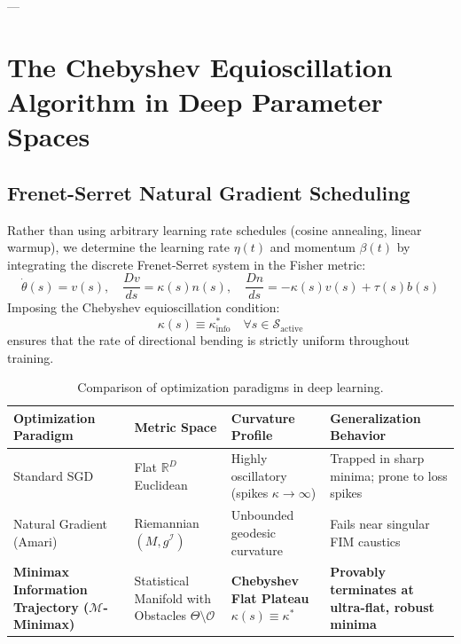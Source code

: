 \documentclass[11pt,reqno]{amsart}
\theoremstyle{definition}
\providecommand{\R}{\mathbb{R}}
\newcommand{\Fisher}{\mathcal{I}}
\numberwithin{equation}{section}
\providecommand{\R}{\mathbb{R}}
\begin{document}
---

\section{The Chebyshev Equioscillation Algorithm in Deep Parameter Spaces}

\subsection{Frenet-Serret Natural Gradient Scheduling}
Rather than using arbitrary learning rate schedules (cosine annealing, linear warmup), we determine the learning rate $\eta(t)$ and momentum $\beta(t)$ by integrating the discrete Frenet-Serret system in the Fisher metric:
\begin{equation}
\dot{\theta}(s) = v(s), \quad \frac{D v}{ds} = \kappa(s) n(s), \quad \frac{D n}{ds} = -\kappa(s) v(s) + \tau(s) b(s)
\end{equation}
Imposing the Chebyshev equioscillation condition:
\begin{equation}
\kappa(s) \equiv \kappa^*_{\mathrm{info}} \quad \forall s \in \mathcal{S}_{\mathrm{active}}
\end{equation}
ensures that the rate of directional bending is strictly uniform throughout training.

\begin{table}[htbp]
\centering
\small
\renewcommand{\arraystretch}{1.3}
\begin{tabularx}{\textwidth}{@{} >{\raggedright\arraybackslash}p{2.8cm} >{\raggedright\arraybackslash}p{3.0cm} >{\raggedright\arraybackslash}X >{\raggedright\arraybackslash}X @{}}
\toprule
\textbf{Optimization Paradigm} & \textbf{Metric Space} & \textbf{Curvature Profile} & \textbf{Generalization Behavior} \\
\midrule
Standard SGD & Flat $\R^D$ Euclidean & Highly oscillatory (spikes $\kappa \to \infty$) & Trapped in sharp minima; prone to loss spikes \\
Natural Gradient (Amari) & Riemannian $(M, g^{\Fisher})$ & Unbounded geodesic curvature & Fails near singular FIM caustics \\
\textbf{Minimax Information Trajectory ($\mathcal{M}$-Minimax)} & Statistical Manifold with Obstacles $\Theta \setminus \mathcal{O}$ & \textbf{Chebyshev Flat Plateau $\kappa(s) \equiv \kappa^*$} & \textbf{Provably terminates at ultra-flat, robust minima} \\
\bottomrule
\end{tabularx}
\caption{Comparison of optimization paradigms in deep learning.}
\end{table}
\end{document}
